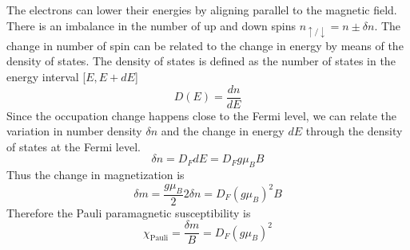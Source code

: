 \documentclass[aps,prb,onecolumn,notitlepage,showpacs,floatfix,superscriptaddress]{revtex4-1}
\begin{document}
The electrons can lower their energies by aligning parallel to the magnetic field. There is an imbalance in the number of up and down spins $n_{\uparrow/\downarrow}=n\pm\delta n$. The change in number of spin can be related to the change in energy by means of the density of states.
The density of states is defined as the number of states in the energy interval [$E,E+dE$]
\begin{equation}
D(E)=\dfrac{d n}{d E}
\end{equation}
Since the occupation change happens close to the Fermi level, we can relate the variation in number density $\delta n$ and the change in energy $dE$ through the density of states at the Fermi level.
\begin{equation}
\delta n =D_{F} dE = D_F g \mu_B B
\end{equation}
Thus the change in magnetization is 
\begin{equation}
\delta m = \dfrac{g \mu_B}{2} 2\delta n = D_F (g \mu_B)^2 B
\end{equation}
Therefore the Pauli paramagnetic susceptibility is
\begin{equation}
\chi_\mathrm{Pauli} = \dfrac{\delta m}{B} = D_F (g \mu_B)^2
\end{equation}
\end{document}
